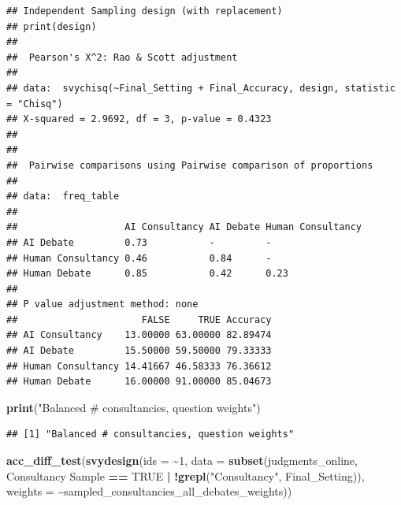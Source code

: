 \documentclass[
]{article}
\newenvironment{Shaded}{\begin{snugshade}}{\end{snugshade}}
\newcommand{\AttributeTok}[1]{\textcolor[rgb]{0.13,0.29,0.53}{#1}}
\newcommand{\ConstantTok}[1]{\textcolor[rgb]{0.56,0.35,0.01}{#1}}
\newcommand{\DecValTok}[1]{\textcolor[rgb]{0.00,0.00,0.81}{#1}}
\newcommand{\FunctionTok}[1]{\textcolor[rgb]{0.13,0.29,0.53}{\textbf{#1}}}
\newcommand{\NormalTok}[1]{#1}
\newcommand{\SpecialCharTok}[1]{\textcolor[rgb]{0.81,0.36,0.00}{\textbf{#1}}}
\newcommand{\StringTok}[1]{\textcolor[rgb]{0.31,0.60,0.02}{#1}}
\begin{document}
\begin{verbatim}
## Independent Sampling design (with replacement)
## print(design)
## 
##  Pearson's X^2: Rao & Scott adjustment
## 
## data:  svychisq(~Final_Setting + Final_Accuracy, design, statistic = "Chisq")
## X-squared = 2.9692, df = 3, p-value = 0.4323
## 
## 
##  Pairwise comparisons using Pairwise comparison of proportions 
## 
## data:  freq_table 
## 
##                   AI Consultancy AI Debate Human Consultancy
## AI Debate         0.73           -         -                
## Human Consultancy 0.46           0.84      -                
## Human Debate      0.85           0.42      0.23             
## 
## P value adjustment method: none 
##                      FALSE     TRUE Accuracy
## AI Consultancy    13.00000 63.00000 82.89474
## AI Debate         15.50000 59.50000 79.33333
## Human Consultancy 14.41667 46.58333 76.36612
## Human Debate      16.00000 91.00000 85.04673
\end{verbatim}

\begin{Shaded}
\begin{Highlighting}[]
\FunctionTok{print}\NormalTok{(}\StringTok{"Balanced \# consultancies, question weights"}\NormalTok{)}
\end{Highlighting}
\end{Shaded}

\begin{verbatim}
## [1] "Balanced # consultancies, question weights"
\end{verbatim}

\begin{Shaded}
\begin{Highlighting}[]
\FunctionTok{acc\_diff\_test}\NormalTok{(}\FunctionTok{svydesign}\NormalTok{(}\AttributeTok{ids =} \SpecialCharTok{\textasciitilde{}}\DecValTok{1}\NormalTok{, }\AttributeTok{data =} \FunctionTok{subset}\NormalTok{(judgments\_online, }\StringTok{\textasciigrave{}}\AttributeTok{Consultancy Sample}\StringTok{\textasciigrave{}} \SpecialCharTok{==} \ConstantTok{TRUE} \SpecialCharTok{|} \SpecialCharTok{!}\FunctionTok{grepl}\NormalTok{(}\StringTok{"Consultancy"}\NormalTok{, Final\_Setting)), }\AttributeTok{weights =} \SpecialCharTok{\textasciitilde{}}\NormalTok{sampled\_consultancies\_all\_debates\_weights))}
\end{Highlighting}
\end{Shaded}
\end{document}
